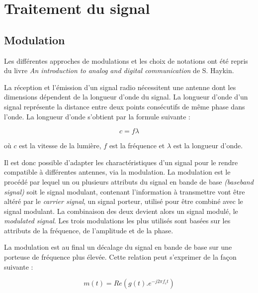 \section{Traitement du signal}

\subsection{Modulation}\label{mod}

Les différentes approches de modulations et les choix de notations ont été repris du livre \textit{An introduction to analog and digital communication} de S. Haykin\cite{book1}.

\vspace{0.1cm}

La réception et l'émission d'un signal radio nécessitent une antenne dont les dimensions dépendent de la longueur d'onde du signal. La longueur d'onde d'un signal représente la distance entre deux points consécutifs de même phase dans l'onde. La longueur d'onde s'obtient par la formule suivante :

\begin{equation}\label{eq1}
c = f \lambda
\end{equation}

où $c$ est la vitesse de la lumière, $f$ est la fréquence et $\lambda$ est la longueur d'onde.

\vspace{0.1cm}

Il est donc possible d'adapter les charactéristiques d'un signal pour le rendre compatible à différentes antennes, via la modulation. La modulation est le procédé par lequel un ou plusieurs attributs du signal en bande de base \textit{(baseband signal)} soit le signal modulant, contenant l'information à transmettre vont être altéré par le \textit{carrier signal}, un signal porteur, utilisé pour être combiné avec le signal modulant. La combinaison des deux devient alors un signal modulé, le \textit{modulated signal}. Les trois modulations les plus utilisés sont basées sur les attributs de la fréquence, de l'amplitude et de la phase.

\vspace{0.1cm}

La modulation est au final un décalage du signal en bande de base sur une porteuse de fréquence plus élevée. Cette relation peut s'exprimer de la façon suivante : 

\begin{equation}\label{eq110}
m(t) = Re( g(t).e^{-j2\pi f_c t})
\end{equation}

